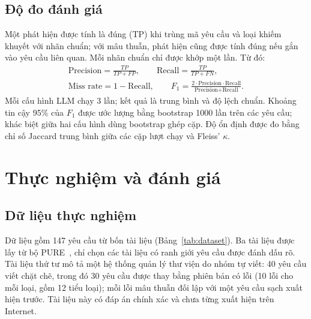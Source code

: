 \documentclass[12pt,a4paper]{report}
\begin{document}
\section{Độ đo đánh giá}
Một phát hiện được tính là đúng (TP) khi trùng mã yêu cầu và loại khiếm khuyết với nhãn chuẩn; với mâu thuẫn, phát hiện cũng được tính đúng nếu gắn vào yêu cầu liên quan. Mỗi nhãn chuẩn chỉ được khớp một lần. Từ đó:
\begin{gather*}
  \text{Precision} = \frac{TP}{TP + FP}, \qquad
  \text{Recall} = \frac{TP}{TP + FN}, \\
  \text{Miss rate} = 1 - \text{Recall}, \qquad
  F_1 = \frac{2 \cdot \text{Precision} \cdot \text{Recall}}{\text{Precision} + \text{Recall}}.
\end{gather*}
Mỗi cấu hình LLM chạy 3 lần; kết quả là trung bình và độ lệch chuẩn. Khoảng tin cậy 95\% của $F_1$ được ước lượng bằng bootstrap 1000 lần trên các yêu cầu; khác biệt giữa hai cấu hình dùng bootstrap ghép cặp. Độ ổn định được đo bằng chỉ số Jaccard trung bình giữa các cặp lượt chạy và Fleiss' $\kappa$.

\chapter{Thực nghiệm và đánh giá}

\section{Dữ liệu thực nghiệm}
Dữ liệu gồm 147 yêu cầu từ bốn tài liệu (Bảng~\ref{tab:dataset}). Ba tài liệu được lấy từ bộ PURE~\cite{ferrari2017}, chỉ chọn các tài liệu có ranh giới yêu cầu được đánh dấu rõ. Tài liệu thứ tư mô tả một hệ thống quản lý thư viện do nhóm tự viết: 40 yêu cầu viết chặt chẽ, trong đó 30 yêu cầu được thay bằng phiên bản có lỗi (10 lỗi cho mỗi loại, gồm 12 tiểu loại); mỗi lỗi mâu thuẫn đối lập với một yêu cầu sạch xuất hiện trước. Tài liệu này có đáp án chính xác và chưa từng xuất hiện trên Internet.
\end{document}
